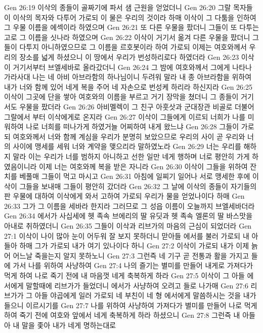 Gen 26:19  이삭의 종들이 골짜기에 파서 샘 근원을 얻었더니
Gen 26:20  그랄 목자들이 이삭의 목자와 다투어 가로되 이 물은 우리의 것이라 하매 이삭이 그 다툼을 인하여 그 우물 이름을 에섹이라 하였으며
Gen 26:21  또 다른 우물을 팠더니 그들이 또 다투는고로 그 이름을 싯나라 하였으며
Gen 26:22  이삭이 거기서 옮겨 다른 우물을 팠더니 그들이 다투지 아니하였으므로 그 이름을 르호봇이라 하여 가로되 이제는 여호와께서 우리의 장소를 넓게 하셨으니 이 땅에서 우리가 번성하리로다 하였더라
Gen 26:23  이삭이 거기서부터 브엘세바로 올라갔더니
Gen 26:24  그 밤에 여호와께서 그에게 나타나 가라사대 나는 네 아비 아브라함의 하나님이니 두려워 말라 내 종 아브라함을 위하여 내가 너와 함께 있어 네게 복을 주어 네 자손으로 번성케 하리라 하신지라
Gen 26:25  이삭이 그곳에 단을 쌓아 여호와의 이름을 부르고 거기 장막을 쳤더니 그 종들이 거기서도 우물을 팠더라
Gen 26:26  아비멜렉이 그 친구 아훗삿과 군대장관 비골로 더불어 그랄에서 부터 이삭에게로 온지라
Gen 26:27  이삭이 그들에게 이르되 너희가 나를 미워하여 나로 너희를 떠나가게 하였거늘 어찌하여 내게 왔느냐
Gen 26:28  그들이 가로되 여호와께서 너와 함께 계심을 우리가 분명히 보았으므로 우리의 사이 곧 우리와 너의 사이에 맹세를 세워 너와 계약을 맺으리라 말하였노라
Gen 26:29  너는 우리를 해하지 말라 이는 우리가 너를 범하지 아니하고 선한 일만 네게 행하며 너로 평안히 가게 하였음이니라 이제 너는 여호와께 복을 받은 자니라
Gen 26:30  이삭이 그들을 위하여 잔치를 베풀매 그들이 먹고 마시고
Gen 26:31  아침에 일찌기 일어나 서로 맹세한 후에 이삭이 그들을 보내매 그들이 평안히 갔더라
Gen 26:32  그 날에 이삭의 종들이 자기들의 판 우물에 대하여 이삭에게 와서 고하여 가로되 우리가 물을 얻었나이다 하매
Gen 26:33  그가 그 이름을 세바라 한지라 그러므로 그 성읍 이름이 오늘까지 브엘세바더라
Gen 26:34  에서가 사십세에 헷 족속 브에리의 딸 유딧과 헷 족속 엘론의 딸 바스맛을 아내로 취하였더니
Gen 26:35  그들이 이삭과 리브가의 마음의 근심이 되었더라
Gen 27:1  이삭이 나이 많아 눈이 어두워 잘 보지 못하더니 맏아들 에서를 불러 가로되 내 아들아 하매 그가 가로되 내가 여기 있나이다 하니
Gen 27:2  이삭이 가로되 내가 이제 늙어 어느날 죽을는지 알지 못하노니
Gen 27:3  그런즉 네 기구 곧 전통과 활을 가지고 들에 가서 나를 위하여 사냥하여
Gen 27:4  나의 즐기는 별미를 만들어 내게로 가져다가 먹게 하여 나로 죽기 전에 내 마음껏 네게 축복하게 하라
Gen 27:5  이삭이 그 아들 에서에게 말할때에 리브가가 들었더니 에서가 사냥하여 오려고 들로 나가매
Gen 27:6  리브가가 그 아들 야곱에게 일러 가로되 네 부친이 네 형 에서에게 말씀하시는 것을 내가 들으니 이르시기를
Gen 27:7  나를 위하여 사냥하여 가져다가 별미를 만들어 나로 먹게 하여 죽기 전에 여호와 앞에서 네게 축복하게 하라 하셨으니
Gen 27:8  그런즉 내 아들아 내 말을 좇아 내가 네게 명하는대로
